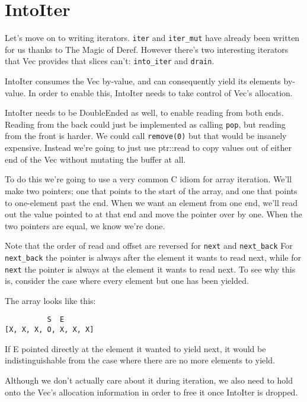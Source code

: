 \documentclass[a4paper,]{book}
\begin{document}
\section{IntoIter}\label{sec--vec-into-iter}

Let's move on to writing iterators. \texttt{iter} and \texttt{iter\_mut}
have already been written for us thanks to The Magic of Deref. However
there's two interesting iterators that Vec provides that slices can't:
\texttt{into\_iter} and \texttt{drain}.

IntoIter consumes the Vec by-value, and can consequently yield its
elements by-value. In order to enable this, IntoIter needs to take
control of Vec's allocation.

IntoIter needs to be DoubleEnded as well, to enable reading from both
ends. Reading from the back could just be implemented as calling
\texttt{pop}, but reading from the front is harder. We could call
\texttt{remove(0)} but that would be insanely expensive. Instead we're
going to just use ptr::read to copy values out of either end of the Vec
without mutating the buffer at all.

To do this we're going to use a very common C idiom for array iteration.
We'll make two pointers; one that points to the start of the array, and
one that points to one-element past the end. When we want an element
from one end, we'll read out the value pointed to at that end and move
the pointer over by one. When the two pointers are equal, we know we're
done.

Note that the order of read and offset are reversed for \texttt{next}
and \texttt{next\_back} For \texttt{next\_back} the pointer is always
after the element it wants to read next, while for \texttt{next} the
pointer is always at the element it wants to read next. To see why this
is, consider the case where every element but one has been yielded.

The array looks like this:

\begin{verbatim}
          S  E
[X, X, X, O, X, X, X]
\end{verbatim}

If E pointed directly at the element it wanted to yield next, it would
be indistinguishable from the case where there are no more elements to
yield.

Although we don't actually care about it during iteration, we also need
to hold onto the Vec's allocation information in order to free it once
IntoIter is dropped.
\end{document}
